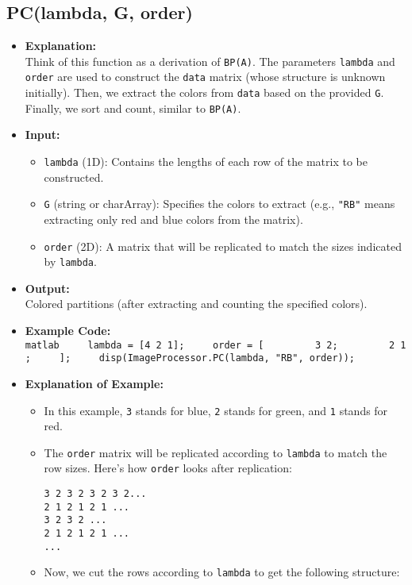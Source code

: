\documentclass[11pt]{amsart}
\theoremstyle{remark}
\providecommand{\tightlist}{%
  \setlength{\itemsep}{0pt}\setlength{\parskip}{0pt}}
\theoremstyle{definition}
\theoremstyle{remark}
\numberwithin{equation}{section}
\begin{document}
\subsection{PC(lambda, G, order)}\label{pclambda-g-order}

\begin{itemize}
\item
  \textbf{Explanation:}\\
  Think of this function as a derivation of \texttt{BP(A)}. The
  parameters \texttt{lambda} and \texttt{order} are used to construct
  the \texttt{data} matrix (whose structure is unknown initially). Then,
  we extract the colors from \texttt{data} based on the provided
  \texttt{G}. Finally, we sort and count, similar to \texttt{BP(A)}.
\item
  \textbf{Input:}

  \begin{itemize}
  \tightlist
  \item
    \texttt{lambda} (1D): Contains the lengths of each row of the matrix
    to be constructed.
  \item
    \texttt{G} (string or charArray): Specifies the colors to extract
    (e.g., \texttt{"RB"} means extracting only red and blue colors from
    the matrix).
  \item
    \texttt{order} (2D): A matrix that will be replicated to match the
    sizes indicated by \texttt{lambda}.
  \end{itemize}
\item
  \textbf{Output:}\\
  Colored partitions (after extracting and counting the specified
  colors).
\item
  \textbf{Example Code:}
  \texttt{matlab\ \ \ \ \ lambda\ =\ {[}4\ 2\ 1{]};\ \ \ \ \ order\ =\ {[}\ \ \ \ \ \ \ \ \ 3\ 2;\ \ \ \ \ \ \ \ \ 2\ 1;\ \ \ \ \ {]};\ \ \ \ \ disp(ImageProcessor.PC(lambda,\ "RB",\ order));}
\item
  \textbf{Explanation of Example:}

  \begin{itemize}
  \item
    In this example, \texttt{3} stands for blue, \texttt{2} stands for
    green, and \texttt{1} stands for red.\\
  \item
    The \texttt{order} matrix will be replicated according to
    \texttt{lambda} to match the row sizes. Here's how \texttt{order}
    looks after replication:

\begin{verbatim}
3 2 3 2 3 2 3 2...
2 1 2 1 2 1 ...
3 2 3 2 ...
2 1 2 1 2 1 ...
...
\end{verbatim}
  \item
    Now, we cut the rows according to \texttt{lambda} to get the
    following structure:


\end{itemize}
\end{itemize}
\end{document}
